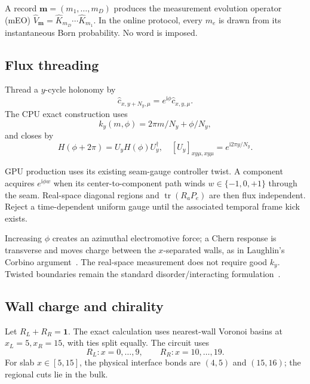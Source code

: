 \documentclass[aps,prb,onecolumn,nofootinbib,superscriptaddress]{revtex4-2}
\newcommand{\tr}{\operatorname{tr}}
\newcommand{\ii}{\mathrm{i}}
\begin{document}
A record $\bm m=(m_1,\ldots,m_D)$ produces the measurement evolution operator
(mEO) $\hat V_{\bm m}=\hat K_{m_D}\cdots\hat K_{m_1}$.  In the online protocol,
every $m_e$ is drawn from its instantaneous Born probability.  No word is
imposed.

\subsection{Flux threading}

Thread a $y$-cycle holonomy by
\begin{equation}
 \hat c_{x,y+N_y,\mu}=e^{\ii\phi}\hat c_{x,y,\mu}.
 \label{eq:bc}
\end{equation}
The CPU exact construction uses
\begin{equation}
 k_y(m,\phi)=2\pi m/N_y+\phi/N_y,
 \label{eq:ky}
\end{equation}
and closes by
\begin{equation}
 H(\phi+2\pi)=U_yH(\phi)U_y^\dagger,\quad
 [U_y]_{xy\mu,xy\mu}=e^{\ii2\pi y/N_y}.
 \label{eq:closure}
\end{equation}

GPU production uses its existing seam-gauge controller twist.  A component
acquires $e^{\ii\phi w}$ when its center-to-component path winds
$w\in\{-1,0,+1\}$ through the seam.  Real-space diagonal regions and
$\tr(R_aP_e)$ are then flux independent.  Reject a time-dependent uniform
gauge until the associated temporal frame kick exists.

Increasing $\phi$ creates an azimuthal electromotive force; a Chern response is
transverse and moves charge between the $x$-separated walls, as in Laughlin's
Corbino argument~\cite{Laughlin1981,Halperin1982}.  The real-space measurement
does not require good $k_y$.  Twisted boundaries remain the standard
disorder/interacting formulation~\cite{NiuThouless1984,NiuThoulessWu1985}.

\subsection{Wall charge and chirality}

Let $R_L+R_R=\mathbf{1}$.  The exact calculation uses nearest-wall Voronoi
basins at $x_L=5,x_R=15$, with ties split equally.  The circuit uses
\begin{equation}
 R_L:x=0,\ldots,9,\qquad R_R:x=10,\ldots,19.
 \label{eq:regions}
\end{equation}
For slab $x\in[5,15]$, the physical interface bonds are $(4,5)$ and $(15,16)$;
the regional cuts lie in the bulk.
\end{document}
